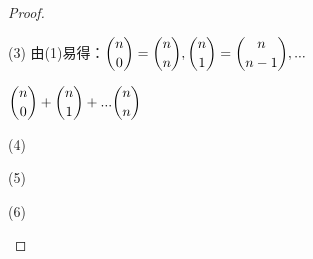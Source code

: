 \documentclass[lang=cn,newtx,10pt,scheme=chinese]{elegantbook}
\begin{document}
\begin{problemset}[习题 1.2]
\begin{proof}
\begin{framed}
            \item[(3)] 由(1)易得：$\dbinom{n}{0} = \dbinom{n}{n}, \dbinom{n}{1} = \dbinom{n}{n-1}, ...$\vspace{6pt}\\
            \item[] $\dbinom{n}{0} + \dbinom{n}{1} + ... \dbinom{n}{n}$\vspace{6pt}
            \item[(4)] $ $\vspace{6pt}
            \item[(5)] $ $\vspace{6pt}
            \item[(6)] $ $\vspace{6pt}
        \end{framed}
    \end{proof}
\end{problemset}
\end{document}
